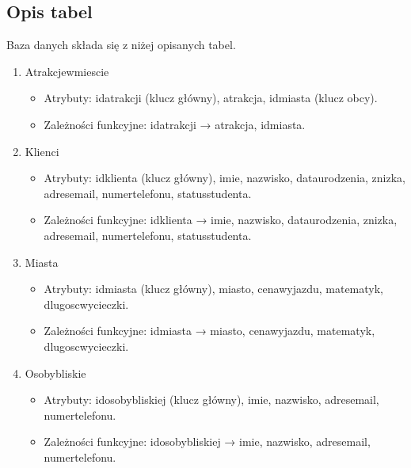 \documentclass{article}
\begin{document}
	\subsection{Opis tabel}
	
	Baza danych składa się z niżej opisanych tabel. 
	
	\begin{enumerate}
		
		\item Atrakcje\textunderscore w\textunderscore miescie
		\begin{itemize}
			\item Atrybuty: id\textunderscore atrakcji (klucz główny), atrakcja, id\textunderscore miasta (klucz obcy).
			\item Zależności funkcyjne: id\textunderscore atrakcji → atrakcja, id\textunderscore miasta.
		\end{itemize}
		
		\item Klienci
		\begin{itemize}
			\item Atrybuty: id\textunderscore klienta (klucz główny), imie, nazwisko, data\textunderscore urodzenia, znizka, adres\textunderscore email, numer\textunderscore telefonu, status\textunderscore studenta.
			\item Zależności funkcyjne: id\textunderscore klienta → imie, nazwisko, data\textunderscore urodzenia, znizka, adres\textunderscore email, numer\textunderscore telefonu, status\textunderscore studenta.
		\end{itemize}
		
		\item Miasta
		\begin{itemize}
			\item Atrybuty: id\textunderscore miasta (klucz główny), miasto, cena\textunderscore wyjazdu, matematyk, dlugosc\textunderscore wycieczki.
			\item Zależności funkcyjne: id\textunderscore miasta → miasto, cena\textunderscore wyjazdu, matematyk, dlugosc\textunderscore wycieczki.
		\end{itemize}
		
		\item Osoby\textunderscore bliskie
		\begin{itemize}
			\item Atrybuty: id\textunderscore osoby\textunderscore bliskiej (klucz główny), imie, nazwisko, adres\textunderscore email, numer\textunderscore telefonu.
			\item Zależności funkcyjne: id\textunderscore osoby\textunderscore bliskiej → imie, nazwisko, adres\textunderscore email, numer\textunderscore telefonu.
		\end{itemize}
		

\end{enumerate}
\end{document}
